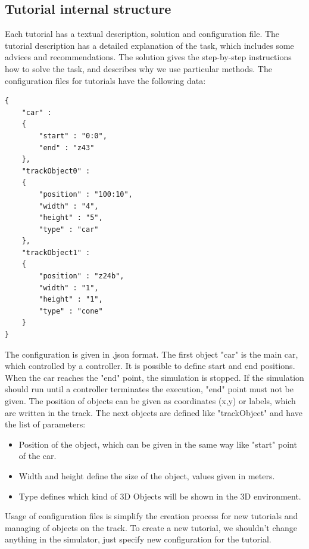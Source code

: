 \subsection{Tutorial internal structure}
Each tutorial has a textual description, solution and configuration file. The tutorial description has a detailed explanation of the task, which includes some advices and recommendations. The solution gives the step-by-step instructions how to solve the task, and describes why we use particular methods. The configuration files for tutorials have the following data:
\bigskip
\begin{lstlisting}
{
    "car" : 
    {
        "start" : "0:0",
        "end" : "z43"
    },
    "trackObject0" :
    {
        "position" : "100:10",
        "width" : "4",
        "height" : "5",
        "type" : "car"
    },
    "trackObject1" :
    {
        "position" : "z24b",
        "width" : "1",
        "height" : "1",
        "type" : "cone"
    }
}
\end{lstlisting}
\bigskip
The configuration is given in .json format. The first object "car" is the main car, which controlled by a controller. It is possible to define start and end positions. When the car reaches the "end" point, the simulation is stopped. If the simulation should run until a controller terminates the execution, "end" point must not be given. The position of objects can be given as coordinates (x,y) or labels, which are written in the track. The next objects are defined like "trackObject" and have the list of parameters:
\begin{itemize}
    \item Position of the object, which can be given in the same way like "start" point of the car.
    \item Width and height define the size of the object, values given in meters.
    \item Type defines which kind of 3D Objects will be shown in the 3D environment.
\end{itemize}
Usage of configuration files is simplify the creation process for new tutorials and managing of objects on the track. To create a new tutorial, we shouldn't change anything in the simulator, just specify new configuration for the tutorial.

